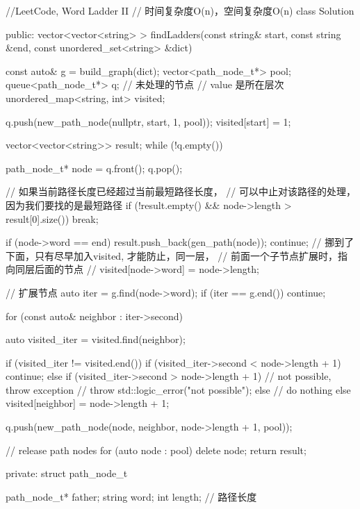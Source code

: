 \begin{Code}
//LeetCode, Word Ladder II
// 时间复杂度O(n)，空间复杂度O(n)
class Solution {
public:
    vector<vector<string> > findLadders(const string& start,
            const string &end, const unordered_set<string> &dict) {
        const auto& g = build_graph(dict);
        vector<path_node_t*> pool;
        queue<path_node_t*> q; // 未处理的节点
        // value 是所在层次
        unordered_map<string, int> visited;

        q.push(new_path_node(nullptr, start, 1, pool));
        visited[start] = 1;

        vector<vector<string>> result;
        while (!q.empty()) {
            path_node_t* node = q.front();
            q.pop();

            // 如果当前路径长度已经超过当前最短路径长度，
            // 可以中止对该路径的处理，因为我们要找的是最短路径
            if (!result.empty() && node->length > result[0].size()) break;

            if (node->word == end) {
                result.push_back(gen_path(node));
                continue;
            }
            // 挪到了下面，只有尽早加入visited, 才能防止，同一层，
            // 前面一个子节点扩展时，指向同层后面的节点
            // visited[node->word] = node->length;

            // 扩展节点
            auto iter = g.find(node->word);
            if (iter == g.end()) continue;

            for (const auto& neighbor : iter->second) {
                auto visited_iter = visited.find(neighbor);

                if (visited_iter != visited.end()) {
                    if (visited_iter->second < node->length + 1) {
                        continue;
                    } else if (visited_iter->second > node->length + 1) {
                        // not possible, throw exception
                        // throw std::logic_error("not possible");
                    } else {
                        // do nothing
                    }
                } else {
                    visited[neighbor] = node->length + 1;
                }

                q.push(new_path_node(node, neighbor, node->length + 1, pool));
            }
        }

        // release path nodes
        for (auto node : pool) {
            delete node;
        }
        return result;
    }

private:
    struct path_node_t {
        path_node_t* father;
        string word;
        int length; // 路径长度

}}
\end{Code}
